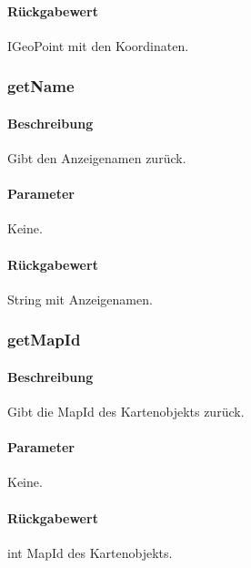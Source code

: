 \paragraph*{Rückgabewert}
IGeoPoint mit den Koordinaten.

\subsubsection{getName}%
\paragraph*{Beschreibung}
Gibt den Anzeigenamen zurück.
\paragraph*{Parameter}
Keine.
\paragraph*{Rückgabewert}
String mit Anzeigenamen.

\subsubsection{getMapId}%
\paragraph*{Beschreibung}
Gibt die MapId des Kartenobjekts zurück.
\paragraph*{Parameter}
Keine.
\paragraph*{Rückgabewert}
int MapId des Kartenobjekts.